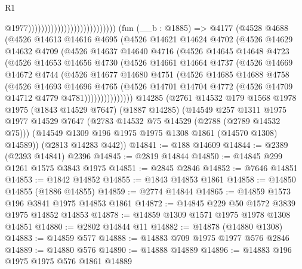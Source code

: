 \begin{lexlean}{R1}
\begin{coremodule}
                                                          @1977)))))))))))))))))))))))))))
    (fun (__b : @1885) =>
    @4177
      (@4528
        @4688
        (@4526
          @14613
          @14616
          @4695
          (@4526
            @14621
            @14624
            @4702
            (@4526
              @14629
              @14632
              @4709
              (@4526
                @14637
                @14640
                @4716
                (@4526
                  @14645
                  @14648
                  @4723
                  (@4526
                    @14653
                    @14656
                    @4730
                    (@4526
                      @14661
                      @14664
                      @4737
                      (@4526
                        @14669
                        @14672
                        @4744
                        (@4526
                          @14677
                          @14680
                          @4751
                          (@4526
                            @14685
                            @14688
                            @4758
                            (@4526
                              @14693
                              @14696
                              @4765
                              (@4526
                                @14701
                                @14704
                                @4772
                                (@4526 @14709 @14712 @4779 @4781)))))))))))))))
    @14285
    (@2761
      @14532
      @179
      @1568
      @1978
      @1975
      (@1843 @14529 @7647)
      (@1887 @14285)
      (@14549
        @257
        @1311
        @1975
        @1977
        @14529
        @7647
        (@2783 @14532 @75 @14529 (@2788 (@2789 @14532 @75)))
        (@14549 @1309 @196 @1975 @1975 @1308 @1861 (@14570 @1308) @14589))
      (@2813 @14283 @442))
@14841 := @188 @14609
@14844 := @2389 (@2393 @14841) @2396
@14845 := @2819 @14844
@14850 := @14845 @299 @1261 @1575 @3843 @1975
@14851 := @2845 @2846
@14852 := @7646 @14851
@14853 := @1842 @14852
@14855 := @1843 @14853 @1861
@14858 := @14850 @14855 (@1886 @14855)
@14859 := @2774 @14844
@14865 := @14859 @1573 @196 @3841 @1975 @14853 @1861
@14872 := @14845 @229 @50 @1572 @3839 @1975 @14852 @14853
@14878 := @14859 @1309 @1571 @1975 @1978 @1308 @14851
@14880 := @2802 @14844 @11
@14882 := @14878 (@14880 @1308)
@14883 := @14859 @577
@14888 := @14883 @709 @1975 @1977 @576 @2846
@14889 := @14880 @576
@14890 := @14888 @14889
@14896 := @14883 @196 @1975 @1975 @576 @1861 @14889

\end{coremodule}
\end{lexlean}
